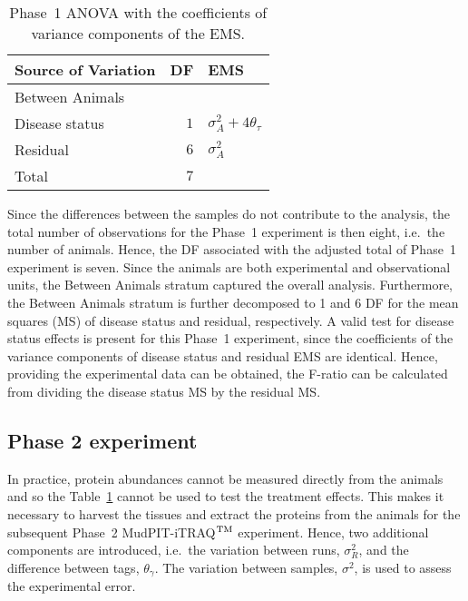 \documentclass[article]{jss}
\begin{document}
\begin{table}[ht]
\centering
\caption{Phase~1 ANOVA with the coefficients of variance components of the EMS.}
\begin{tabular}[t]{lrl}
\toprule
\multicolumn{1}{l}{\textbf{Source of Variation}} & \multicolumn{1}{l}{\textbf{DF}} & \multicolumn{1}{l}{\textbf{EMS}}\\
\midrule
Between Animals 		\\
\hspace{3mm}Disease status 	& $1$ 	& $\sigma_{A}^2 + 4\theta_{\tau}$\\
\hspace{3mm}Residual		& $6$ 	& $\sigma_{A}^2$\\\hline
Total 						& $7$    & \\
\bottomrule
\end{tabular}
\label{tab:Phase1ANOVA}
\end{table}

Since the differences between the samples do not contribute to the analysis, the total number of observations for the Phase~1 experiment is then eight, i.e.\ the number of animals. Hence, the DF associated with the adjusted total of Phase~1 experiment is seven. Since the animals are both experimental and observational units, the Between Animals stratum captured the overall analysis. Furthermore, the Between Animals stratum is further decomposed to 1 and 6 DF for the mean squares (MS) of disease status and residual, respectively. A valid test for disease status effects is present for this Phase~1 experiment, since the coefficients of the variance components of disease status and residual EMS are identical. Hence, providing the experimental data can be obtained, the F-ratio can be calculated from dividing the disease status MS by the residual MS. 

\subsection{Phase 2 experiment}
\label{subsec:Phase2Exp}
In practice, protein abundances cannot be measured directly from the animals and so the Table~\ref{tab:Phase1ANOVA} cannot be used to test the treatment effects. This makes it necessary to harvest the tissues and extract the proteins from the animals for the subsequent Phase~2 MudPIT-iTRAQ$^{\rm TM}$ experiment. Hence, two additional components are introduced, i.e.\ the variation between runs, $\sigma_{R}^2$, and the difference between tags, $\theta_{\gamma}$. The variation between samples, $\sigma^2$, is used to assess the experimental error. 
\end{document}

